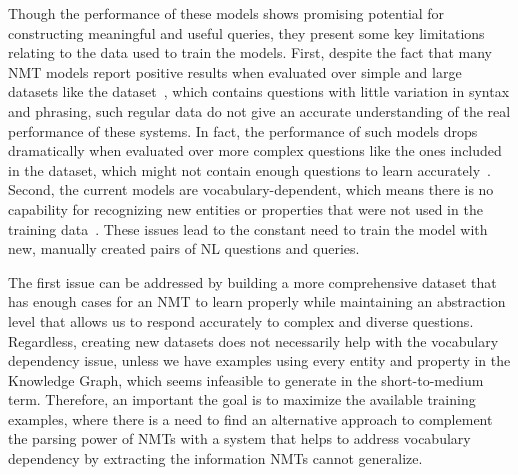 Though the performance of these models shows promising potential for constructing meaningful 
and useful \SPARQL{} queries, they present some key limitations relating to the data 
used to train the models. First, despite the fact that many NMT models report positive results 
when evaluated over simple and large datasets like the \DBNQA{} dataset~\cite{nmt:nl-to-sparql-Yin19}, 
which contains questions with little variation in syntax and phrasing, such regular data do not give 
an accurate understanding of the real performance of these systems. In fact, the performance of such 
models drops dramatically when evaluated over more complex questions like the ones included in the 
\LCQuADone dataset, which might not contain enough questions to learn 
accurately~\cite{nmt:nl-to-sparql-Yin19}. Second, the current models are vocabulary-dependent, which 
means there is no capability for recognizing new entities or properties that were not used in the 
training data~\cite{nmt:nl-to-sparql-Yin19}. These issues lead to the constant need to train the model 
with new, manually created pairs of NL questions and \SPARQL{} queries.

The first issue can be addressed by building a more comprehensive dataset that has enough 
cases for an NMT to learn properly while maintaining an abstraction level that allows us to 
respond accurately to complex and diverse questions. Regardless, creating new datasets does 
not necessarily help with the vocabulary dependency issue, unless we have examples using 
every entity and property in the Knowledge Graph, which seems infeasible to generate in the 
short-to-medium term. Therefore, an important the goal is to maximize the available training examples, 
where there is a need to find an alternative approach to complement the parsing power 
of NMTs with a system that helps to address vocabulary dependency by extracting the 
information NMTs cannot generalize.

